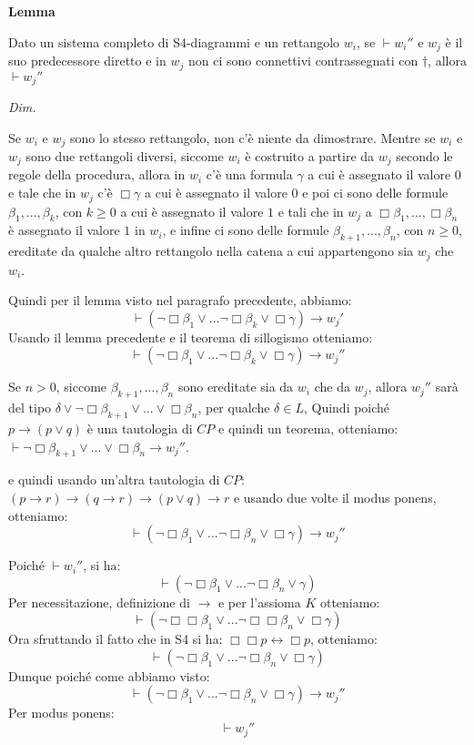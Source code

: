 \documentclass[a4paper, titlepage, 12pt]{report}
\begin{document}
\begin{flushleft}
\textbf{Lemma}

Dato un sistema completo di S4-diagrammi e un rettangolo $w_i$, se $\vdash w_i''$
e $w_j$ è il suo predecessore diretto e in $w_j$ non ci sono connettivi contrassegnati
con $\dagger$,
allora $\vdash w_j''$

\textit{Dim.}

Se $w_i$ e $w_j$ sono lo stesso rettangolo, non c'è niente da dimostrare.
Mentre se $w_i$ e $w_j$ sono due rettangoli diversi, siccome $w_i$ è costruito
a partire da $w_j$ secondo le regole della procedura, allora in $w_i$ c'è
una formula $\gamma$ a cui è assegnato il valore $0$ e tale che in $w_j$ c'è
$\Box \gamma$ a cui è assegnato il valore $0$ e poi ci sono delle formule
$\beta_1, ..., \beta_k$, con $k \geq 0$ a cui è assegnato il valore $1$ e tali che in $w_j$
a $\Box \beta_1, ..., \Box \beta_n$ è assegnato il valore $1$ in $w_i$,
e infine ci sono delle formule $\beta_{k+1}, ..., \beta_{n}$, con $n \geq 0$,  ereditate da qualche
altro rettangolo nella catena a cui appartengono sia $w_j$ che $w_i$.

Quindi per il lemma visto nel paragrafo precedente, abbiamo:
$$\vdash (\neg \Box \beta_1 \lor ... \neg \Box \beta_k \lor \Box \gamma) \rightarrow w_j'$$
Usando il lemma precedente e il teorema di sillogismo otteniamo:
$$\vdash (\neg \Box \beta_1 \lor ... \neg \Box \beta_k \lor \Box \gamma) \rightarrow w_j''$$

Se $n > 0$, siccome $\beta_{k+1}, ..., \beta_{n}$ sono ereditate sia da $w_i$ che da $w_j$,
allora $w_j''$ sarà del tipo $\delta \lor \neg \Box \beta_{k+1} \lor ... \lor \Box \beta_{n}$, per qualche $\delta \in L$,
Quindi poiché $p \rightarrow (p \lor q)$ è una tautologia di $CP$ e quindi un teorema, otteniamo:
$\vdash \neg \Box \beta_{k+1} \lor ... \lor \Box \beta_{n} \rightarrow w_j''$.

e quindi usando un'altra tautologia di $CP$: $(p \rightarrow r) \rightarrow (q \rightarrow r) \rightarrow (p \lor q) \rightarrow r$
e usando due volte il modus ponens, otteniamo:
$$\vdash (\neg \Box \beta_1 \lor ... \neg \Box \beta_n \lor \Box \gamma) \rightarrow w_j''$$

Poiché $\vdash w_i''$, si ha:
$$\vdash (\neg \Box \beta_1 \lor ... \neg \Box \beta_n \lor \gamma)$$
Per necessitazione, definizione di $\rightarrow$ e per l'assioma $K$ otteniamo:
$$\vdash (\neg \Box \Box \beta_1 \lor ... \neg \Box \Box \beta_n \lor \Box \gamma)$$
Ora sfruttando il fatto che in S4 si ha: $\Box \Box p \leftrightarrow \Box p$, otteniamo:
$$\vdash (\neg \Box \beta_1 \lor ... \neg \Box \beta_n \lor \Box \gamma)$$
Dunque poiché come abbiamo visto:
$$\vdash (\neg \Box \beta_1 \lor ... \neg \Box \beta_n \lor \Box \gamma) \rightarrow w_j''$$
Per modus ponens:
$$\vdash w_j''$$

\end{flushleft}
\end{document}
